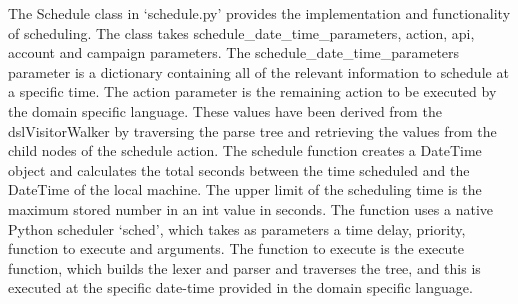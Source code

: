 The Schedule class in `schedule.py' provides the implementation and functionality of scheduling. The class takes schedule\_date\_time\_parameters, action, api, account and campaign parameters. The schedule\_date\_time\_parameters parameter is a dictionary containing all of the relevant information to schedule at a specific time. The action parameter is the remaining action to be executed by the domain specific language. These values have been derived from the dslVisitorWalker by traversing the parse tree and retrieving the values from the child nodes of the schedule action. The schedule function creates a DateTime object and calculates the total seconds between the time scheduled and the DateTime of the local machine. The upper limit of the scheduling time is the maximum stored number in an int value in seconds. The function uses a native Python scheduler `sched', which takes as parameters a time delay, priority, function to execute and arguments. The function to execute is the execute function, which builds the lexer and parser and traverses the tree, and this is executed at the specific date-time provided in the domain specific language.
